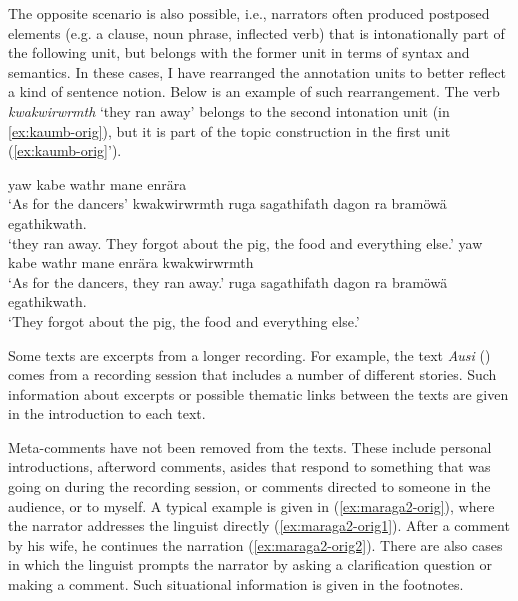 The opposite scenario is also possible, i.e., narrators often produced postposed elements (e.g. a clause, noun phrase, inflected verb) that is intonationally part of the following unit, but belongs with the former unit in terms of syntax and semantics. In these cases, I have rearranged the annotation units to better reflect a kind of sentence notion. Below is an example of such rearrangement. The verb \textit{kwakwirwrmth} `they ran away' belongs to the second intonation unit (in \ref{ex:kaumb-orig}), but it is part of the topic construction in the first unit (\ref{ex:kaumb-orig}').

\ea \label{ex:kaumb-orig}
    \ea \label{ex:kaumb-orig-1}
        yaw kabe wathr mane enrära\\
        \glt `As for the dancers'
    \ex \label{ex:kaumb-orig-2}
        kwakwirwrmth ruga sagathifath dagon ra bramöwä egathikwath.\\
        \glt `they ran away. They forgot about the pig, the food and everything else.' 
    \z
    \label{ex:kaumb-orig-4}
        \ea \label{ex:kaumb-1}
            yaw kabe wathr mane enrära kwakwirwrmth\\
            \glt `As for the dancers, they ran away.'
        \ex \label{ex:kaumb-2}
            ruga sagathifath dagon ra bramöwä egathikwath.\\
            \glt `They forgot about the pig, the food and everything else.' 
    \z
\z

Some texts are excerpts from a longer recording. For example, the text \textit{Ausi} () comes from a recording session that includes a number of different stories. Such information about excerpts or possible thematic links between the texts are given in the introduction to each text.

Meta-comments have not been removed from the texts. These include personal introductions, afterword comments, asides that respond to something that was going on during the recording session, or comments directed to someone in the audience, or to myself. A typical example is given in (\ref{ex:maraga2-orig}), where the narrator addresses the linguist directly (\ref{ex:maraga2-orig1}). After a comment by his wife, he continues the narration (\ref{ex:maraga2-orig2}). There are also cases in which the linguist prompts the narrator by asking a clarification question or making a comment. Such situational information is given in the footnotes.

